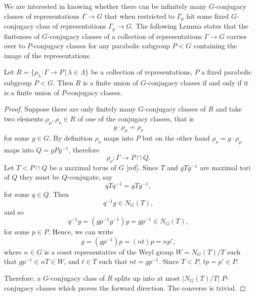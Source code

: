 We are interested in knowing whether there can be infinitely many $G$-conjugacy classes of representations $\Gamma\rightarrow G$ that when restricted to $\Gamma_p$ hit some fixed $G$-conjugacy class of representations $\Gamma_p\rightarrow G$. The following Lemma states that the finiteness of $G$-conjugacy classes of a collection of representations $\Gamma\rightarrow G$ carries over to $P$-conjugacy classes for any parabolic subgroup $P<G$ containing the image of the representations.

\begin{lemma}\label{GIsPConj} Let $R=\{\rho_\lambda:\Gamma\rightarrow P\, |\, \lambda \in \Lambda\}$ be a collection of representations, $P$ a fixed parabolic subgroup $P<G$. Then $R$ is a finite union of $G$-conjugacy classes if and only if it is a finite union of $P$-conjugacy classes.
\end{lemma}
\begin{proof}
	Suppose there are only finitely many $G$-conjugacy classes of $R$ and take two elements $\rho_\mu, \rho_\nu \in R$ of one of the conjugacy classes, that is
	\begin{displaymath}
		g\cdot \rho_\mu = \rho_\nu
	\end{displaymath}
	for some $g \in G$. By definition $\rho_\nu$ maps into $P$ but on the other hand $\rho_\nu = g\cdot \rho_\mu$ maps into $Q = gPg^{-1}$, therefore 
	\begin{displaymath}
		\rho_\nu: \Gamma\rightarrow P \cap Q.
	\end{displaymath}
	Let $T < P \cap Q$ be a maximal torus of $G$ [ref]. Since $T$ and $gTg^{-1}$ are maximal tori of $Q$ they must be $Q$-conjugate, say
	\begin{displaymath}
		qTq^{-1} = gTg^{-1},
	\end{displaymath}
	for some $q \in Q$. Then 
	\begin{displaymath}
		q^{-1}g \in N_G(T),
	\end{displaymath}
	and so
	\begin{displaymath}
		q^{-1}g = (gp^{-1}g^{-1})g = gp^{-1} \in N_G(T),
	\end{displaymath}
	for some $p \in P$. Hence, we can write
	\begin{displaymath}
		g = (gp^{-1})p = (nt)p = np',
	\end{displaymath}
	where $n \in G$ is a coset representative of the Weyl group $W=N_G(T)/T$ such that $gp^{-1} \in nT \in W$, and $t\in T$ such that $nt = gp^{-1}$. Since $T<P$, $tp = p' \in P$.
	
	Therefore, a $G$-conjugacy class of $R$ splits up into at most $|N_G(T)/T|$ $P$-conjugacy classes which proves the forward direction. The converse is trivial.
\end{proof}



